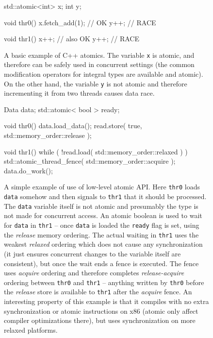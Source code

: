 \begin{figure}[tp]
  \begin{cppcode}
    std::atomic<int> x;
    int y;
  \end{cppcode}
  \begin{multicols}{2}
    \begin{cppcode}
      void thr0() {
        x.fetch_add(1); // OK
        y++; // RACE
      }
    \end{cppcode}
    \columnbreak
    \begin{cppcode}
      void thr1() {
        x++; // also OK
        y++; // RACE
      }
    \end{cppcode}
  \end{multicols}
  \vspace{-4ex}
  \caption{A basic example of C++ atomics.
      The variable \texttt{x} is atomic, and therefore can be safely used in
      concurrent settings (the common modification operators for integral types
      are available and atomic).
      On the other hand, the variable \texttt{y} is not atomic and therefore
      incrementing it from two threads causes data race.
  }\label{fig:prel:cppatomic0}
\end{figure}

\begin{figure}[tp]
  \begin{cppcode}
    Data data;
    std::atomic< bool > ready;

    void thr0() {
      data.load_data();
      read.store( true, std::memory_order::release );
    }

    void thr1() {
      while ( !read.load( std::memory_order::relaxed ) )
      { }
      std::atomic_thread_fence( std::memory_order::acquire );
      data.do_work();
    }
  \end{cppcode}
  \vspace{-2ex}
  \caption{A simple example of use of low-level atomic API.
      Here \texttt{thr0} loads \texttt{data} somehow and then signals to
      \texttt{thr1} that it should be processed.
      The \texttt{data} variable itself is not atomic and presumably the type
      is not made for concurrent access.
      An atomic boolean is used to wait for \texttt{data} in \texttt{thr1} --
      once \texttt{data} is loaded the \texttt{ready} flag is set, using the
      \emph{release} memory ordering.
      The actual waiting in \texttt{thr1} uses the weakest \emph{relaxed}
      ordering which does not cause any synchronization (it just ensures
      concurrent changes to the variable itself are consistent), but once the
      wait ends a fence is executed.
      The fence uses \emph{acquire} ordering and therefore completes
      \emph{release-acquire} ordering between \texttt{thr0} and \texttt{thr1}
      -- anything written by \texttt{thr0} before the \emph{release} store is
      available to \texttt{thr1} after the \emph{acquire} fence.
      An interesting property of this example is that it compiles with no extra
      synchronization or atomic instructions on x86 (atomic only affect
      compiler optimizations there), but uses synchronization on more relaxed
      platforms.
  }\label{fig:prel:cppatomic1}
\end{figure}

